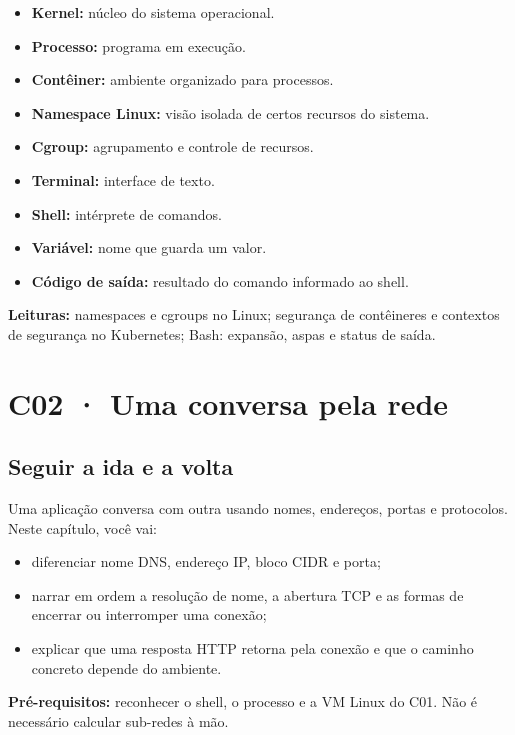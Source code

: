 \documentclass[12pt,openany,oneside,a4paper,chapter=TITLE,english,brazil]{abntex2}
\providecommand{\tightlist}{\setlength{\itemsep}{0pt}\setlength{\parskip}{0pt}}
\begin{document}
\begin{itemize}
\tightlist
\item
  \textbf{Kernel:} núcleo do sistema operacional.
\item
  \textbf{Processo:} programa em execução.
\item
  \textbf{Contêiner:} ambiente organizado para processos.
\item
  \textbf{Namespace Linux:} visão isolada de certos recursos do sistema.
\item
  \textbf{Cgroup:} agrupamento e controle de recursos.
\item
  \textbf{Terminal:} interface de texto.
\item
  \textbf{Shell:} intérprete de comandos.
\item
  \textbf{Variável:} nome que guarda um valor.
\item
  \textbf{Código de saída:} resultado do comando informado ao shell.
\end{itemize}

\textbf{Leituras:} namespaces e cgroups no Linux; segurança de contêineres e contextos de segurança no Kubernetes; Bash: expansão, aspas e status de saída.

\chapter{C02 · Uma conversa pela rede}\label{c02-uma-conversa-pela-rede}

\section{Seguir a ida e a volta}\label{seguir-a-ida-e-a-volta}

Uma aplicação conversa com outra usando nomes, endereços, portas e protocolos. Neste capítulo, você vai:

\begin{itemize}
\tightlist
\item
  diferenciar nome DNS, endereço IP, bloco CIDR e porta;
\item
  narrar em ordem a resolução de nome, a abertura TCP e as formas de encerrar ou interromper uma conexão;
\item
  explicar que uma resposta HTTP retorna pela conexão e que o caminho concreto depende do ambiente.
\end{itemize}

\textbf{Pré-requisitos:} reconhecer o shell, o processo e a VM Linux do C01. Não é necessário calcular sub-redes à mão.
\end{document}
